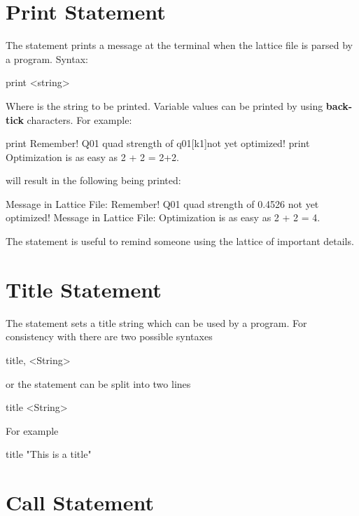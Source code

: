 {{{%
\section{Print Statement}
\label{s:print}

The  statement prints a message at the terminal when the 
lattice file is parsed by a program. Syntax:
\begin{example}
  print <string>
\end{example}
Where  is the string to be printed. Variable values can be printed by using
\textbf{back-tick} characters. For example:
\begin{example}
  print Remember! Q01 quad strength of \backtick{}q01[k1]\backtick not yet optimized!
  print Optimization is as easy as 2 + 2 = \backtick{}2+2\backtick.
\end{example}
will result in the following being printed:
\begin{example}
  Message in Lattice File: Remember! Q01 quad strength of 0.4526 not yet optimized!
  Message in Lattice File: Optimization is as easy as 2 + 2 = 4.
\end{example}

The  statement is useful to remind someone using the lattice of important details.

\section{Title Statement}

The  statement sets a title string which can be used by a program. 
For consistency with \mad there are two possible syntaxes
\begin{example}
  title, <String>
\end{example}
or the statement can be split into two lines
\begin{example}
  title
  <String>
\end{example}
For example
\begin{example}
  title
  "This is a title"
\end{example}

\section{Call Statement}
\label{s:call}

}}}
